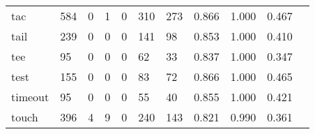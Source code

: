 \begin{longtable}{lp{1.2cm}p{1.2cm}p{1.2cm}p{1.2cm}p{1.2cm}p{1.2cm}p{1.2cm}p{1.2cm}p{1.2cm}p{1.2cm}}
tac       &                                   584 &                                                  0 &                                                  1 &                                                  0 &                                                310 &                                                273 &                                              0.866 &                                              1.000 &                                              0.467 \\
tail      &                                   239 &                                                  0 &                                                  0 &                                                  0 &                                                141 &                                                 98 &                                              0.853 &                                              1.000 &                                              0.410 \\
tee       &                                    95 &                                                  0 &                                                  0 &                                                  0 &                                                 62 &                                                 33 &                                              0.837 &                                              1.000 &                                              0.347 \\
test      &                                   155 &                                                  0 &                                                  0 &                                                  0 &                                                 83 &                                                 72 &                                              0.866 &                                              1.000 &                                              0.465 \\
timeout   &                                    95 &                                                  0 &                                                  0 &                                                  0 &                                                 55 &                                                 40 &                                              0.855 &                                              1.000 &                                              0.421 \\
touch     &                                   396 &                                                  4 &                                                  9 &                                                  0 &                                                240 &                                                143 &                                              0.821 &                                              0.990 &                                              0.361 \\

\end{longtable}
